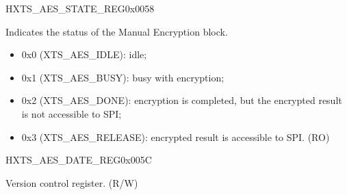\begin{register}{H}{XTS\_AES\_STATE\_REG}{0x0058}\label{regdesc:XTSAESSTATEREG}
%
%
\regnewline%
\begin{regdesc}\begin{reglist}
\item [XTS\_AES\_STATE] Indicates the status of the Manual Encryption block. 
    \begin{itemize}
        \item 0x0 (XTS\_AES\_IDLE): idle;
        \item 0x1 (XTS\_AES\_BUSY): busy with encryption;
        \item 0x2 (XTS\_AES\_DONE): encryption is completed, but the encrypted result is not accessible to SPI;
        \item 0x3 (XTS\_AES\_RELEASE): encrypted result is accessible to SPI. (RO)
    \end{itemize}
\end{reglist}\end{regdesc}
\end{register}


\begin{register}{H}{XTS\_AES\_DATE\_REG}{0x005C}\label{regdesc:XTSAESDATEREG}
%
%
\regnewline%
\begin{regdesc}\begin{reglist}
\item [XTS\_AES\_DATE] Version control register. (R/W)
\end{reglist}\end{regdesc}
\end{register}

